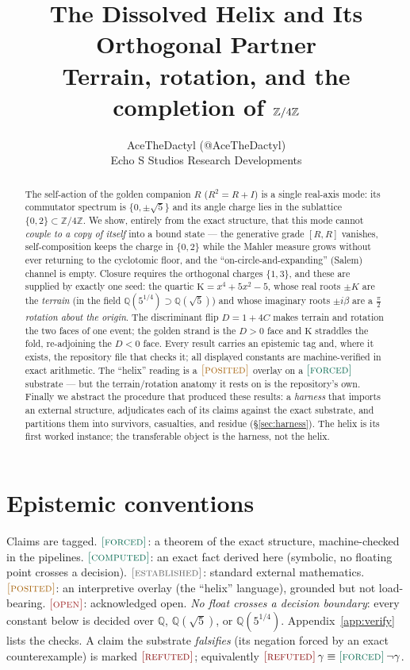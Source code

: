 \documentclass[11pt]{article}
\title{\textbf{The Dissolved Helix and Its Orthogonal Partner}\\[3pt]
\large Terrain, rotation, and the completion of $\Z/4\Z$}
\author{AceTheDactyl (@AceTheDactyl)\\ Echo S Studios Research Developments}
\date{}
\theoremstyle{plain}
\theoremstyle{definition}
\theoremstyle{remark}
\newcommand{\forced}{\textup{\textcolor{forcedc}{\textsc{[forced]}}}}
\newcommand{\computed}{\textup{\textcolor{forcedc}{\textsc{[computed]}}}}
\newcommand{\posited}{\textup{\textcolor{positedc}{\textsc{[posited]}}}}
\newcommand{\openq}{\textup{\textcolor{openc}{\textsc{[open]}}}}
\newcommand{\established}{\textup{\textcolor{estabc}{\textsc{[established]}}}}
\newcommand{\refuted}{\textup{\textcolor{refutedc}{\textsc{[refuted]}}}}
\newcommand{\Q}{\mathbb{Q}}
\newcommand{\Z}{\mathbb{Z}}
\newcommand{\Kf}{\mathrm{K}}
\begin{document}
\maketitle

\begin{abstract}
The self-action of the golden companion $R$ ($R^2=R+I$) is a single real-axis mode: its
commutator spectrum is $\{0,\pm\sqrt5\}$ and its angle charge lies in the sublattice
$\{0,2\}\subset\Z/4\Z$. We show, entirely from the exact structure, that this mode cannot
\emph{couple to a copy of itself} into a bound state --- the generative grade $[R,R]$ vanishes,
self-composition keeps the charge in $\{0,2\}$ while the Mahler measure grows without ever
returning to the cyclotomic floor, and the ``on-circle-and-expanding'' (Salem) channel is empty.
Closure requires the orthogonal charges $\{1,3\}$, and these are supplied by exactly one seed: the
quartic $\Kf=x^4+5x^2-5$, whose real roots $\pm K$ are the \emph{terrain} (in the field
$\Q(5^{1/4})\supset\Q(\sqrt5)$) and whose imaginary roots $\pm i\beta$ are a \emph{$\tfrac{\pi}{2}$
rotation about the origin}. The discriminant flip $D=1+4C$ makes terrain and rotation the two faces
of one event; the golden strand is the $D>0$ face and $\Kf$ straddles the fold, re-adjoining the
$D<0$ face. Every result carries an epistemic tag and, where it exists, the repository file that
checks it; all displayed constants are machine-verified in exact arithmetic. The ``helix'' reading is
a $\posited$ overlay on a $\forced$ substrate --- but the terrain/rotation anatomy it rests on is the
repository's own. Finally we abstract the procedure that produced these results: a \emph{harness} that imports
an external structure, adjudicates each of its claims against the exact substrate, and partitions them into
survivors, casualties, and residue (\S\ref{sec:harness}). The helix is its first worked instance; the
transferable object is the harness, not the helix.
\end{abstract}

\section{Epistemic conventions}\label{sec:conv}
Claims are tagged. $\forced$: a theorem of the exact structure, machine-checked in the pipelines.
$\computed$: an exact fact derived here (symbolic, no floating point crosses a decision). $\established$:
standard external mathematics. $\posited$: an interpretive overlay (the ``helix'' language), grounded but
not load-bearing. $\openq$: acknowledged open. \emph{No float crosses a decision boundary}: every constant
below is decided over $\Q$, $\Q(\sqrt5)$, or $\Q(5^{1/4})$. Appendix~\ref{app:verify} lists the checks.
A claim the substrate \emph{falsifies} (its negation forced by an exact counterexample) is marked $\refuted$;
equivalently $\refuted\,\gamma \equiv \forced\,\neg\gamma$.
\end{document}
